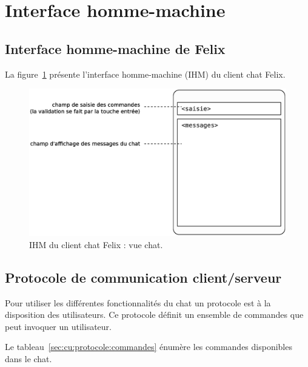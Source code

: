 %

\section{Interface homme-machine}
\label{sec:ihm}

\subsection{Interface homme-machine de Felix}
\label{sec:ihm:felix}

La figure~\ref{sec:ihm:felix:fig} présente l'interface homme-machine (IHM) du client chat Felix.

\begin{figure}[h!]
\includegraphics[width=\linewidth]{../img/Chat_IHM.eps}
\caption{IHM du client chat Felix : vue chat.}
\label{sec:ihm:felix:fig}
\end{figure}

\subsection{Protocole de communication client/serveur}
\label{sec:ihm:protocole}

Pour utiliser les différentes fonctionnalités du chat un protocole est à la disposition des utilisateurs.
Ce protocole définit un ensemble de commandes que peut invoquer un utilisateur.

\medskip
Le tableau~\ref{sec:cu:protocole:commandes} énumère les commandes disponibles dans le chat.

